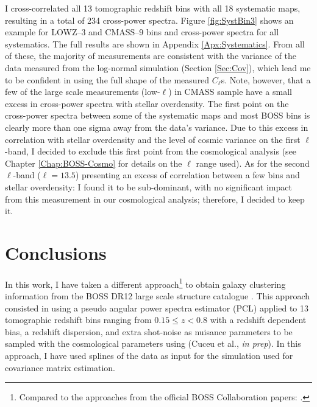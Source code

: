 \qquad I cross-correlated all 13 tomographic redshift bins with all 18 systematic maps, resulting in a total of 234 cross-power spectra. Figure \ref{fig:SystBin3} shows an example for LOWZ--3 and CMASS--9 bins and cross-power spectra for all systematics. The full results are shown in Appendix \ref{Apx:Systematics}. From all of these, the majority of measurements are consistent with the variance of the data measured from the log-normal simulation (Section \ref{Sec:Cov}), which lead me to be confident in using the full shape of the measured $C_{\ell}$s. Note, however, that a few of the large scale measurements (low-$\ell$) in CMASS sample have a small excess in cross-power spectra with stellar overdensity. The first point on the cross-power spectra between some of the systematic maps and most BOSS bins is clearly more than one sigma away from the data's variance. Due to this excess in correlation with stellar overdensity and the level of cosmic variance on the first $\ell$-band, I decided to exclude this first point from the cosmological analysis (see Chapter \ref{Chap:BOSS-Cosmo} for details on the $\ell$ range used). As for the second $\ell$-band ($\ell = 13.5$) presenting an excess of correlation between a few bins and stellar overdensity: I found it to be sub-dominant, with no significant impact from this measurement in our cosmological analysis; therefore, I decided to keep it.

\section{Conclusions}\label{Sec:Concl1}
In this work, I have taken a different approach\footnote{Compared to the approaches from the official BOSS Collaboration papers: \cite{2017RossBOSS,2017BeutlerBOSS,2017Beutler2BOSS,2017SatpathyBOSS,2017SanchezBOSS,2017GriebBOSS,2017SalazarBOSSwTheta,2017WangBOSS,2017ZhaoBOSS}.} to obtain galaxy clustering information from the BOSS DR12 large scale structure catalogue \citep{BOSSCatalogue2016}. This approach consisted in using a pseudo angular power spectra estimator (PCL) applied to 13 tomographic redshift bins ranging from $0.15 \leq z < 0.8$ with a redshift dependent bias, a redshift dispersion, and extra shot-noise as nuisance parameters to be sampled with the cosmological parameters using \uclcl (Cuceu et al., \textit{in prep}). In this approach, I have used splines of the data as input for the simulation used for covariance matrix estimation.

